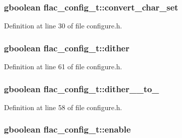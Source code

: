 \subsubsection[{\texorpdfstring{convert\+\_\+char\+\_\+set}{convert_char_set}}]{\setlength{\rightskip}{0pt plus 5cm}gboolean flac\+\_\+config\+\_\+t\+::convert\+\_\+char\+\_\+set}\hypertarget{structflac__config__t_a19c730b12fadee5a94f8b6d7b994b764}{}\label{structflac__config__t_a19c730b12fadee5a94f8b6d7b994b764}


Definition at line 30 of file configure.\+h.

\subsubsection[{\texorpdfstring{dither}{dither}}]{\setlength{\rightskip}{0pt plus 5cm}gboolean flac\+\_\+config\+\_\+t\+::dither}\hypertarget{structflac__config__t_a7652cb64a3710dc3b4b58d98a4f540d2}{}\label{structflac__config__t_a7652cb64a3710dc3b4b58d98a4f540d2}


Definition at line 61 of file configure.\+h.

\subsubsection[{\texorpdfstring{dither\+\_\+24\+\_\+to\+\_\+16}{dither_24_to_16}}]{\setlength{\rightskip}{0pt plus 5cm}gboolean flac\+\_\+config\+\_\+t\+::dither\+\_\+\_\+to\+\_}\hypertarget{structflac__config__t_a4cfb5038eee0428baced32376eb43abb}{}\label{structflac__config__t_a4cfb5038eee0428baced32376eb43abb}


Definition at line 58 of file configure.\+h.

\subsubsection[{\texorpdfstring{enable}{enable}}]{\setlength{\rightskip}{0pt plus 5cm}gboolean flac\+\_\+config\+\_\+t\+::enable}\hypertarget{structflac__config__t_a99896bcdb5bb9077da5a77e25ae4df38}{}\label{structflac__config__t_a99896bcdb5bb9077da5a77e25ae4df38}


